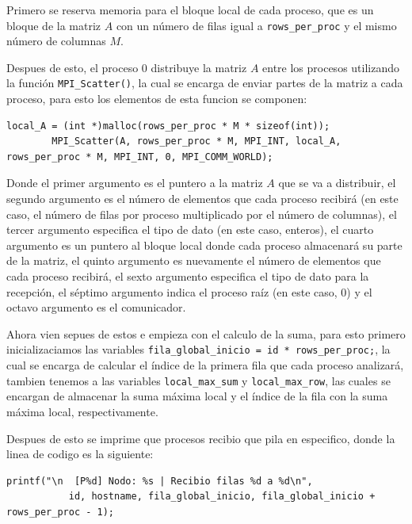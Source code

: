 \documentclass[letterpaper,11pt]{article}
\begin{document}
    Primero se reserva memoria para el bloque local de cada proceso, que es un bloque de la matriz $A$ con un número de filas igual a \texttt{rows\_per\_proc} y el mismo número de columnas $M$.

    Despues de esto, el proceso 0 distribuye la matriz $A$ entre los procesos utilizando la función \texttt{MPI\_Scatter()},
    la cual se encarga de enviar partes de la matriz a cada proceso, para esto los elementos de esta funcion se componen:

    \begin{lstlisting}[style=cstyle,caption={Distribucion de matriz con MPI\_Scatter},label={lst:programa-b}]
        local_A = (int *)malloc(rows_per_proc * M * sizeof(int));
        MPI_Scatter(A, rows_per_proc * M, MPI_INT, local_A, rows_per_proc * M, MPI_INT, 0, MPI_COMM_WORLD);
    \end{lstlisting}
   
    Donde el primer argumento es el puntero a la matriz $A$ que se va a distribuir, el segundo argumento es el número de elementos que cada proceso recibirá (en este caso, el número de filas por proceso multiplicado por el número de columnas), el tercer argumento especifica el tipo de dato (en este caso, enteros), el cuarto argumento es un puntero al bloque local donde cada proceso almacenará su parte de la matriz, el quinto argumento es nuevamente el número de elementos que cada proceso recibirá, el sexto argumento especifica el tipo de dato para la recepción, el séptimo argumento indica el proceso raíz (en este caso, 0) y el octavo argumento es el comunicador.
    
    Ahora vien sepues de estos e empieza con el calculo de la suma, para esto primero inicializaciamos las variables \texttt{fila\_global\_inicio = id * rows\_per\_proc;}, la cual se encarga de calcular el índice de la primera fila que cada proceso analizará, 
    tambien tenemos a las variables \texttt{local\_max\_sum} y \texttt{local\_max\_row}, las cuales se encargan de almacenar la suma máxima local y el índice de la fila con la suma máxima local, respectivamente.

    Despues de esto se imprime que procesos recibio que pila en especifico, donde la linea de codigo es la siguiente:

    \begin{lstlisting}[style=cstyle,caption={Impresion de bloque local recibido por cada proceso},label={lst:programa-b}]
        printf("\n  [P%d] Nodo: %s | Recibio filas %d a %d\n",
           id, hostname, fila_global_inicio, fila_global_inicio + rows_per_proc - 1);
    \end{lstlisting}
\end{document}

